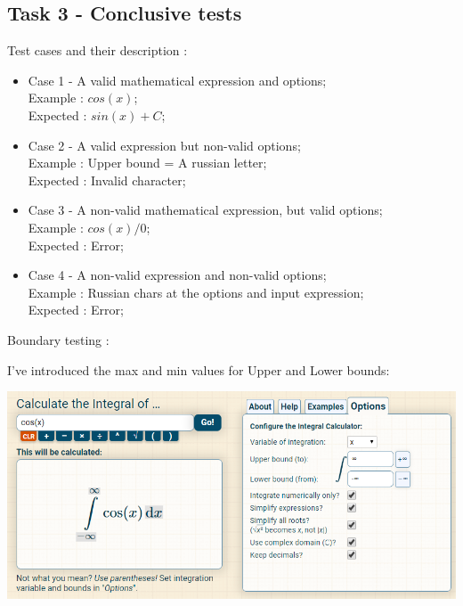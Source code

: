 \subsection{Task 3 - Conclusive tests}

Test cases and their description : 

\begin{itemize}
	\item Case 1 - A valid mathematical expression and options; \\
		  Example : $cos(x)$; \\
		  Expected : $sin(x) + C$; \\
		  
	\item Case 2 - A valid expression but non-valid options; \\
		  Example : Upper bound = A russian letter; \\
		  Expected : Invalid character; \\
	
	\item Case 3 - A non-valid mathematical expression, but valid options; \\
	   	  Example : $cos(x)/0$; \\
	      Expected : Error; \\
	
	\item Case 4 - A non-valid expression and non-valid options; \\
		  Example : Russian chars at the options and input expression; \\
		  Expected : Error; \\
\end{itemize}

Boundary testing : 

I've introduced the max and min values for Upper and Lower bounds: 

\begin{center}
	\includegraphics[scale=0.7]{images/Capture2}
\end{center}

